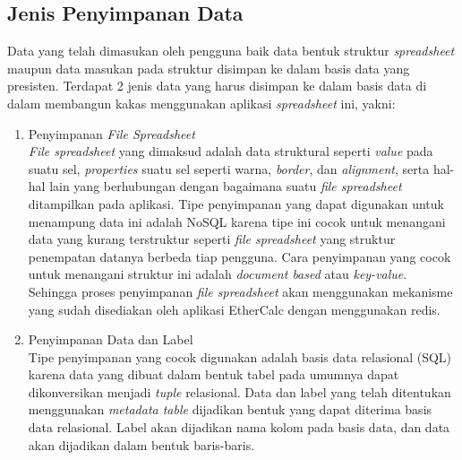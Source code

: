 	\subsection{Jenis Penyimpanan Data} \label{JenisPenyimpanan}
	Data yang telah dimasukan oleh pengguna baik data bentuk struktur \textit{spreadsheet} maupun data masukan pada struktur disimpan ke dalam basis data yang presisten. Terdapat 2 jenis data yang harus disimpan ke dalam basis data di dalam membangun kakas menggunakan aplikasi \textit{spreadsheet} ini, yakni:

	\begin{enumerate}
		\item Penyimpanan \textit{File Spreadsheet} \\
		\textit{File spreadsheet} yang dimaksud adalah data struktural seperti \textit{value} pada suatu sel, \textit{properties} suatu sel seperti warna, \textit{border}, dan \textit{alignment}, serta hal-hal lain yang berhubungan dengan bagaimana suatu \textit{file spreadsheet} ditampilkan pada aplikasi. Tipe penyimpanan yang dapat digunakan untuk menampung data ini adalah NoSQL karena tipe ini cocok untuk menangani data yang kurang terstruktur seperti \textit{file spreadsheet} yang struktur penempatan datanya berbeda tiap pengguna. Cara penyimpanan yang cocok untuk menangani struktur ini adalah \textit{document based} atau \textit{key-value}. Sehingga proses penyimpanan \textit{file spreadsheet} akan menggunakan mekanisme yang sudah disediakan oleh aplikasi EtherCalc dengan menggunakan redis.

		\item Penyimpanan Data dan Label \\
		Tipe penyimpanan yang cocok digunakan adalah basis data relasional (SQL) karena data yang dibuat dalam bentuk tabel pada umumnya dapat dikonversikan menjadi \textit{tuple} relasional. Data dan label yang telah ditentukan menggunakan \textit{metadata table} dijadikan bentuk yang dapat diterima basis data relasional. Label akan dijadikan nama kolom pada basis data, dan data akan dijadikan dalam bentuk baris-baris.



	\end{enumerate}

